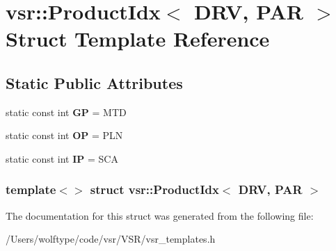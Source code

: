 \hypertarget{structvsr_1_1_product_idx_3_01_d_r_v_00_01_p_a_r_01_4}{\section{vsr\-:\-:Product\-Idx$<$ D\-R\-V, P\-A\-R $>$ Struct Template Reference}
\label{structvsr_1_1_product_idx_3_01_d_r_v_00_01_p_a_r_01_4}
}
\subsection*{Static Public Attributes}
\begin{DoxyCompactItemize}
\item 
\hypertarget{structvsr_1_1_product_idx_3_01_d_r_v_00_01_p_a_r_01_4_a5dbd0d5be695bb7831f8d5568a890b89}{static const int {\bfseries G\-P} = M\-T\-D}\label{structvsr_1_1_product_idx_3_01_d_r_v_00_01_p_a_r_01_4_a5dbd0d5be695bb7831f8d5568a890b89}

\item 
\hypertarget{structvsr_1_1_product_idx_3_01_d_r_v_00_01_p_a_r_01_4_afd1d1482caa26eb9b51c0cf4aa007ad3}{static const int {\bfseries O\-P} = P\-L\-N}\label{structvsr_1_1_product_idx_3_01_d_r_v_00_01_p_a_r_01_4_afd1d1482caa26eb9b51c0cf4aa007ad3}

\item 
\hypertarget{structvsr_1_1_product_idx_3_01_d_r_v_00_01_p_a_r_01_4_a6516532aa4d3ee4847a066ad2dc26a8a}{static const int {\bfseries I\-P} = S\-C\-A}\label{structvsr_1_1_product_idx_3_01_d_r_v_00_01_p_a_r_01_4_a6516532aa4d3ee4847a066ad2dc26a8a}

\end{DoxyCompactItemize}
\subsubsection*{template$<$$>$ struct vsr\-::\-Product\-Idx$<$ D\-R\-V, P\-A\-R $>$}



The documentation for this struct was generated from the following file\-:\begin{DoxyCompactItemize}
\item 
/\-Users/wolftype/code/vsr/\-V\-S\-R/vsr\-\_\-templates.\-h\end{DoxyCompactItemize}
